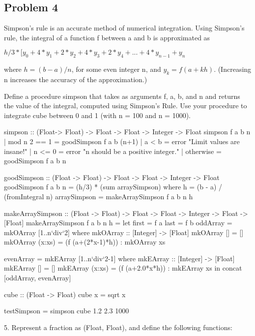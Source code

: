 \documentclass{report}%
\begin{document}
\subsection{Problem 4}
Simpson’s rule is an accurate  method  of  numerical  integration.
Using Simpson’s rule, the integral of a function f  between  a  and  b
is approximated as

  $h/3* [y_0 + 4*y_1 + 2*y_2 + 4*y_3 + 2*y_4 +...  + 4*y_{n-1}  +
  y_n$

   where $h = (b−a)/n$, for some even integer  n,  and $y_k  =
   f(a+kh)$.  (Increasing  n  increases  the   accuracy   of   the
   approximation.)

Define a procedure simpson that takes as arguments f, a, b, and n  and
returns the value of the  integral, computed using Simpson’s Rule. Use
your procedure to integrate cube between 0 and 1 (with n = 100  and  n
= 1000).

\par

\nwenddocs{}\endmoddef\nwstartdeflinemarkup\nwenddeflinemarkup
simpson :: (Float-> Float) -> Float -> Float -> Integer -> Float
simpson f a b n | mod n 2 == 1 = goodSimpson f a b (n+1)
                | a < b = error "Limit values are insane!"
                | n <= 0 = error "n should be a positive integer."
                | otherwise = goodSimpson f a b n

goodSimpson :: (Float -> Float) -> Float -> Float -> Integer -> Float
goodSimpson f a b n = (h/3) * (sum arraySimpson) 
    where h = (b - a) / (fromIntegral n)
          arraySimpson = makeArraySimpson f a b n h

makeArraySimpson :: (Float -> Float) -> Float -> Float -> Integer -> Float -> [Float]
makeArraySimpson f a b n h 
    = let
        first = f a
        last = f b
        oddArray = mkOArray [1..n`div`2] where
            mkOArray :: [Integer] -> [Float]
            mkOArray [] = []
            mkOArray (x:xs) = (f (a+(2*x-1)*h)) : mkOArray xs

        evenArray = mkEArray [1..n`div`2-1] where
            mkEArray :: [Integer] -> [Float]
            mkEArray [] = []
            mkEArray (x:xs) = (f (a+2.0*x*h)) : mkEArray xs 
    in 
        concat [oddArray, evenArray]
            
cube :: (Float -> Float)
cube x = sqrt x

testSimpson = simpson cube 1.2 2.3 1000
\nwendcode{}\nwdocspar

5.  Represent a fraction as (Float, Float), and define  the  following
functions:
\end{document}
